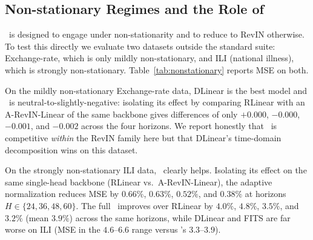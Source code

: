 \subsection{Non-stationary Regimes and the Role of \arevin}
\label{sec:results:nonstat}

\arevin\ is designed to engage under non-stationarity and to reduce to RevIN
otherwise. To test this directly we evaluate two datasets outside the standard
suite: Exchange-rate, which is only mildly non-stationary, and ILI (national
illness), which is strongly non-stationary. Table~\ref{tab:nonstationary}
reports MSE on both.


On the mildly non-stationary Exchange-rate data, DLinear is the best model and
\arevin\ is neutral-to-slightly-negative: isolating its effect by comparing
RLinear with an A-RevIN-Linear of the same backbone gives differences of only
$+0.000$, $-0.000$, $-0.001$, and $-0.002$ across the four horizons. We report
honestly that \method\ is competitive \emph{within} the RevIN family here but
that DLinear's time-domain decomposition wins on this dataset.

On the strongly non-stationary ILI data, \arevin\ clearly helps. Isolating its
effect on the same single-head backbone (RLinear vs.\ A-RevIN-Linear), the
adaptive normalization reduces MSE by $0.66\%$, $0.63\%$, $0.52\%$, and $0.38\%$
at horizons $H \in \{24,36,48,60\}$. The full \method\ improves over RLinear by
$4.0\%$, $4.8\%$, $3.5\%$, and $3.2\%$ (mean $3.9\%$) across the same horizons,
while DLinear and FITS are far worse on ILI (MSE in the $4.6$--$6.6$ range versus
\method's $3.3$--$3.9$).

